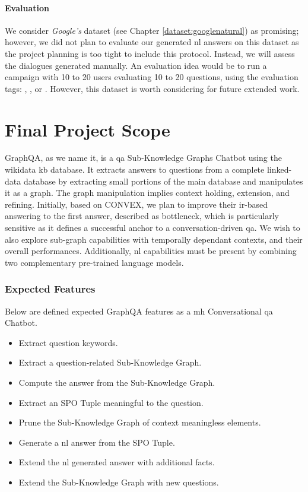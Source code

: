 \paragraph{Evaluation}
We consider \textit{Google's} dataset (see Chapter \ref{dataset:googlenatural}) as promising; however, we did not plan to evaluate our generated \gls{nl} answers on this dataset as the project planning is too tight to include this protocol. Instead, we will assess the dialogues generated manually. An evaluation idea would be to run a campaign with 10 to 20 users evaluating 10 to 20 questions, using the evaluation tags: , , or . However, this dataset is worth considering for future extended work. 

\section{Final Project Scope}
\label{analysis:finalscope}
GraphQA, as we name it, is a \gls{qa} Sub-Knowledge Graphs Chatbot using  the \gls{wikidata} \gls{kb} database. It extracts answers to questions from a complete \gls{linked-data} database by extracting small portions of the main database and manipulates it as a graph. The graph manipulation implies context holding, extension, and refining. Initially, based on CONVEX, we plan to improve their \gls{ir}-based answering to the first answer, described as bottleneck, which is particularly sensitive as it defines a successful anchor to a conversation-driven \gls{qa}. We wish to also explore sub-graph capabilities with temporally dependant contexts, and their overall performances. Additionally, \gls{nl} capabilities must be present by combining two complementary pre-trained language models.

\subsubsection{Expected Features}
Below are defined expected GraphQA features as a \gls{mh} Conversational \gls{qa} Chatbot.

\begin{itemize}
    \setlength\itemsep{0em}
    \item Extract question keywords.
    \item Extract a question-related Sub-Knowledge Graph.
    \item Compute the answer from the Sub-Knowledge Graph.
    \item Extract an SPO Tuple meaningful to the question.
    \item Prune the Sub-Knowledge Graph of context meaningless elements.
    \item Generate a \gls{nl} answer from the SPO Tuple.
    \item Extend the \gls{nl} generated answer with additional facts.
    \item Extend the Sub-Knowledge Graph with new questions.
\end{itemize}


